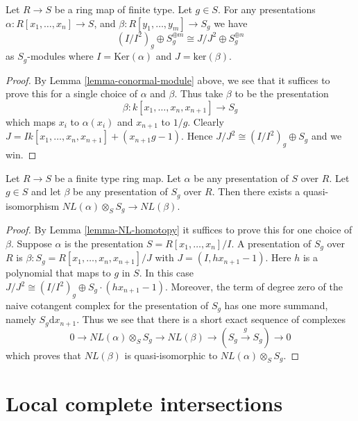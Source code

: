 \begin{lemma}
\label{lemma-conormal-module-localize}
Let $R \to S$ be a ring map of finite type.
Let $g \in S$. For any presentations
$\alpha : R[x_1, \ldots, x_n] \to S$, and
$\beta : R[y_1, \ldots, y_m] \to S_g$ we have
$$
(I/I^2)_g \oplus S^{\oplus m}_g \cong J/J^2 \oplus S_g^{\oplus n}
$$
as $S_g$-modules where
$I = \text{Ker}(\alpha)$ and $J = \text{ker}(\beta)$.
\end{lemma}

\begin{proof}
By Lemma \ref{lemma-conormal-module} above, we see that
it suffices to prove this for a single choice of $\alpha$
and $\beta$. Thus take $\beta$ to be the presentation
$$
\beta : k[x_1, \ldots, x_n , x_{n + 1}] \longrightarrow S_g
$$
which maps $x_i$ to $\alpha(x_i)$ and $x_{n + 1}$ to $1/g$.
Clearly $J = Ik[x_1, \ldots, x_n , x_{n + 1}] +
(x_{n + 1}g - 1)$. Hence $J/J^2 \cong (I/I^2)_g \oplus S_g$
and we win.
\end{proof}

\begin{lemma}
\label{lemma-localize-NL}
Let $R \to S$ be a finite type ring map.
Let $\alpha$ be any presentation of $S$ over $R$.
Let $g \in S$ and let $\beta$ be any presentation of $S_g$ over $R$.
Then there exists a quasi-isomorphism
$NL(\alpha)\otimes_S S_g \to NL(\beta)$.
\end{lemma}

\begin{proof}
By Lemma \ref{lemma-NL-homotopy} it suffices to prove this
for one choice of $\beta$. Suppose $\alpha$ is the
presentation $S = R[x_1, \ldots, x_n]/I$.
A presentation of $S_g$ over $R$ is
$\beta : S_g = R[x_1, \ldots, x_n, x_{n + 1}]/J$ with
$J = (I, h x_{n + 1} - 1)$. Here $h$ is a polynomial
that maps to $g$ in $S$. In this case $J/J^2
\cong (I/I^2)_g \oplus S_g \cdot (h x_{n + 1} - 1)$.
Moreover, the term of degree zero of the naive cotangent complex
for the presentation of $S_g$ has one more summand,
namely $S_g \text{d}x_{n + 1}$. Thus we see that
there is a short exact sequence of complexes
$$
0 \to NL(\alpha) \otimes_S S_g \to NL(\beta) \to
(S_g \xrightarrow{g} S_g) \to 0
$$
which proves that $NL(\beta)$ is quasi-isomorphic to
$NL(\alpha) \otimes_S S_g$.
\end{proof}







\section{Local complete intersections}
\label{section-lci}

